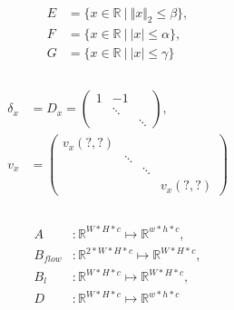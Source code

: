 \documentclass[A4,12pt]{article}
\DeclareMathOperator*{\argmin}{arg\,min}
\newcommand{\R}{\mathbb{R}}
\newcommand{\norm}[1]{\Vert #1 \Vert}
\begin{document}
\\
\begin{equation}
\begin{aligned}
E &= \{x \in \R ~|~ \norm{x}_2 \leq \beta \}, \\
F &= \{x \in \R ~|~ |x| \leq \alpha \}, \\
G &= \{x \in \R ~|~ |x| \leq \gamma \} \\
\end{aligned}
\end{equation}
\\
\begin{equation}
\begin{aligned}
\delta_x&=D_x=\begin{pmatrix}1 & -1 & \\ & \ddots & \\ & & \ddots \end{pmatrix}, \\
v_x&=\begin{pmatrix}v_x(?,?)& & & \\ & \ddots & & \\ & & \ddots & \\ & & & v_x(?,?) \end{pmatrix}  \\
\end{aligned}
\end{equation}
\\
\begin{equation}
\begin{aligned}
A&\colon\R^{W*H*c}\mapsto\R^{w*h*c}, \\
B_{flow}&\colon\R^{2*W*H*c}\mapsto\R^{W*H*c}, \\
B_l&\colon\R^{W*H*c}\mapsto\R^{W*H*c}, \\
D&\colon\R^{W*H*c}\mapsto\R^{w*h*c} \\
\end{aligned}
\end{equation}



\end{document}
